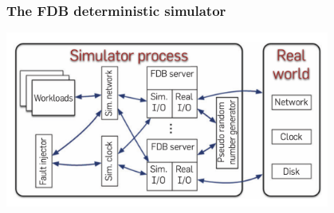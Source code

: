 \begin{frame}
    \frametitle{The FDB deterministic simulator}
    \begin{center}
        \includegraphics[width=0.8\textwidth]{img/3-Testing/The FDB deterministic simulator.png}
    \end{center}
    
\end{frame}


